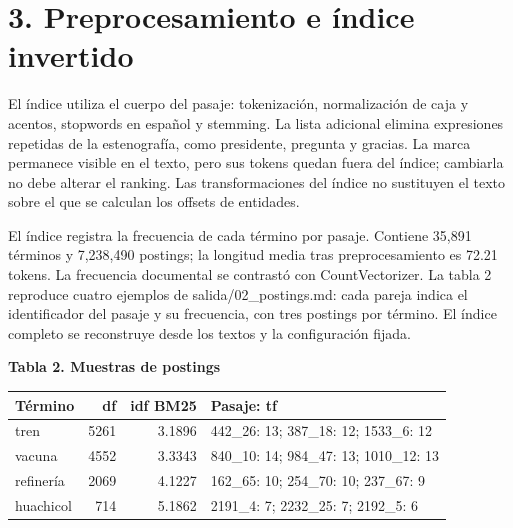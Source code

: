 \documentclass[11pt,a4paper]{article}
\begin{document}
\section*{3. Preprocesamiento e índice invertido}
\par
El índice utiliza el cuerpo del pasaje: tokenización, normalización de caja y acentos, stopwords en español y stemming. La lista adicional elimina expresiones repetidas de la estenografía, como presidente, pregunta y gracias. La marca permanece visible en el texto, pero sus tokens quedan fuera del índice; cambiarla no debe alterar el ranking. Las transformaciones del índice no sustituyen el texto sobre el que se calculan los offsets de entidades.
\par
El índice registra la frecuencia de cada término por pasaje. Contiene 35,891 términos y 7,238,490 postings; la longitud media tras preprocesamiento es 72.21 tokens. La frecuencia documental se contrastó con CountVectorizer. La tabla 2 reproduce cuatro ejemplos de salida/\allowbreak{}02\_\allowbreak{}postings.md: cada pareja indica el identificador del pasaje y su frecuencia, con tres postings por término. El índice completo se reconstruye desde los textos y la configuración fijada.
\par
\par\medskip\noindent\begin{minipage}{\linewidth}
\textbf{Tabla 2. Muestras de postings}\par\smallskip
\begin{tabularx}{\linewidth}{@{}lrrY@{}}\toprule
Término & df & idf BM25 & Pasaje: tf \\ \midrule
tren & 5261 & 3.1896 & 442\_\allowbreak{}26: 13; 387\_\allowbreak{}18: 12; 1533\_\allowbreak{}6: 12 \\
vacuna & 4552 & 3.3343 & 840\_\allowbreak{}10: 14; 984\_\allowbreak{}47: 13; 1010\_\allowbreak{}12: 13 \\
refinería & 2069 & 4.1227 & 162\_\allowbreak{}65: 10; 254\_\allowbreak{}70: 10; 237\_\allowbreak{}67: 9 \\
huachicol & 714 & 5.1862 & 2191\_\allowbreak{}4: 7; 2232\_\allowbreak{}25: 7; 2192\_\allowbreak{}5: 6 \\
\bottomrule\end{tabularx}\end{minipage}\par\medskip
\par
\end{document}
